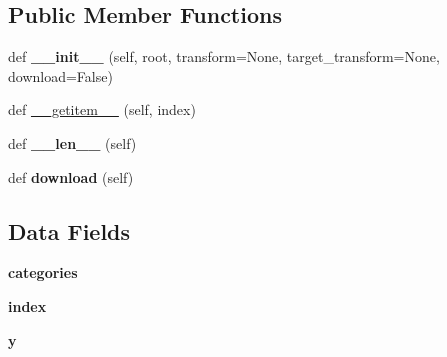 \subsection*{Public Member Functions}
\begin{DoxyCompactItemize}
\item 
\mbox{\label{classtorchvision_1_1datasets_1_1caltech_1_1Caltech256_aa99a081834592baa0134947ad21f8aaa}} 
def {\bfseries \+\_\+\+\_\+init\+\_\+\+\_\+} (self, root, transform=None, target\+\_\+transform=None, download=False)
\item 
def \hyperlink{classtorchvision_1_1datasets_1_1caltech_1_1Caltech256_ae52450820a61e9056b9c8480c768c876}{\+\_\+\+\_\+getitem\+\_\+\+\_\+} (self, index)
\item 
\mbox{\label{classtorchvision_1_1datasets_1_1caltech_1_1Caltech256_a5c1670c640a26893a16fb2e8677d9b52}} 
def {\bfseries \+\_\+\+\_\+len\+\_\+\+\_\+} (self)
\item 
\mbox{\label{classtorchvision_1_1datasets_1_1caltech_1_1Caltech256_a139dd3f83733dff936d9704b2c8c4383}} 
def {\bfseries download} (self)
\end{DoxyCompactItemize}
\subsection*{Data Fields}
\begin{DoxyCompactItemize}
\item 
\mbox{\label{classtorchvision_1_1datasets_1_1caltech_1_1Caltech256_a8997988b9a7ab5cc0e3d29e7c88593c7}} 
{\bfseries categories}
\item 
\mbox{\label{classtorchvision_1_1datasets_1_1caltech_1_1Caltech256_a7cb21c3fa056d99bccf8f0d07057f6c3}} 
{\bfseries index}
\item 
\mbox{\label{classtorchvision_1_1datasets_1_1caltech_1_1Caltech256_a33e462c8a696776eb569a3e978baeb45}} 
{\bfseries y}
\end{DoxyCompactItemize}


